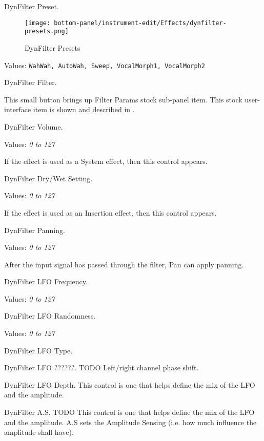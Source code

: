    DynFilter Preset.

\begin{figure}[H]
   \centering 
   \texttt{[image: bottom-panel/instrument-edit/Effects/dynfilter-presets.png]}
   \caption{DynFilter Presets}
   \label{fig:effects_dynfilter_presets}
\end{figure}

   Values: \texttt{WahWah, AutoWah, Sweep, VocalMorph1, VocalMorph2}

   DynFilter Filter.

   This small button brings up Filter Params stock sub-panel item.
   This stock user-interface item is shown and described in
   .

   DynFilter Volume.

   Values: \textsl{0 to 127}

   If the effect is used as a System effect, then this control appears.

   DynFilter Dry/Wet Setting.

   Values: \textsl{0 to 127}

   If the effect is used as an Insertion effect, then this control appears.

   DynFilter Panning.

   Values: \textsl{0 to 127}

   After the input signal has passed through the filter, Pan can apply
   panning.

   DynFilter LFO Frequency.

   Values: \textsl{0 to 127}

   DynFilter LFO Randomness.

   Values: \textsl{0 to 127}

   DynFilter LFO Type.

   DynFilter LFO ??????.  TODO
   Left/right channel phase shift.

   DynFilter LFO Depth.
   This control is one that helps define the mix of the LFO and the
   amplitude.

   DynFilter A.S. TODO
   This control is one that helps define the mix of the LFO and the
   amplitude.
   A.S sets the Amplitude Sensing (i.e. how much influence the amplitude
   shall have).

